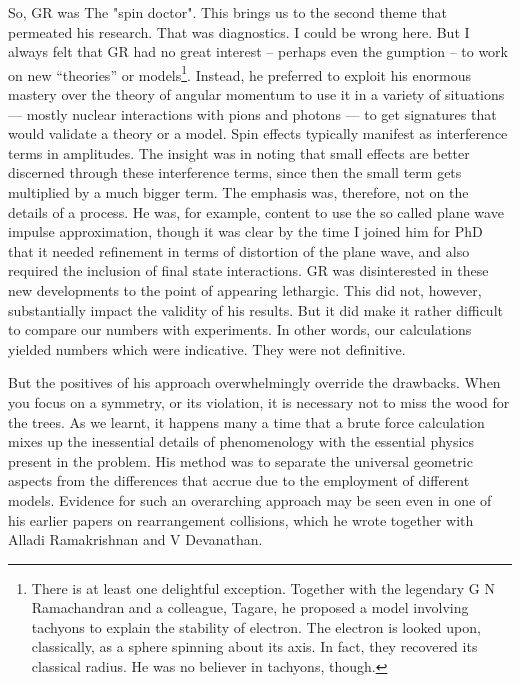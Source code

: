 So, GR was The "spin doctor". This brings us to the second theme that 
permeated his research. That was diagnostics. I could be wrong here. But 
I always felt that GR had no great interest -- perhaps even the gumption 
-- to work on new “theories” or models\footnote{There is at least one 
delightful exception. Together with the legendary G N Ramachandran and a 
colleague, Tagare, he proposed a model involving tachyons to explain the 
stability of electron. The electron is looked upon, classically, as a 
sphere spinning about its axis. In fact, they recovered its classical 
radius.  He was no believer in tachyons, though.}. Instead, he preferred 
to exploit his enormous mastery over the theory of angular momentum to 
use it in a variety of situations --- mostly nuclear interactions with 
pions and photons — to get signatures that would validate a theory or a 
model. Spin effects typically manifest as interference terms in 
amplitudes. The insight was in noting that small effects are better 
discerned through these interference terms, since then the small term 
gets multiplied by a much bigger term.  The emphasis was, therefore, not 
on the details of a process. He was, for example, content to use the so 
called plane wave impulse approximation, though it was clear by the time 
I joined him for PhD that it needed refinement in terms of distortion of 
the plane wave, and also required the inclusion of final state 
interactions. GR was disinterested in these new developments to the 
point of appearing lethargic. This did not, however, substantially 
impact the validity of his results. But it did make it rather difficult 
to compare our numbers with experiments. In other words, our 
calculations yielded numbers which were indicative. They were not 
definitive.

But the positives of his approach overwhelmingly override the drawbacks. 
When you focus on a symmetry, or its violation, it is necessary not to 
miss the wood for the trees. As we learnt, it happens many a time that a 
brute force calculation mixes up the inessential details of 
phenomenology with the essential physics present in the problem. His 
method was to separate the universal geometric aspects from the 
differences that accrue due to the employment of different models. 
Evidence for such an overarching approach may be seen even in one of his 
earlier papers on rearrangement collisions, which he wrote together 
with Alladi Ramakrishnan and V Devanathan.


